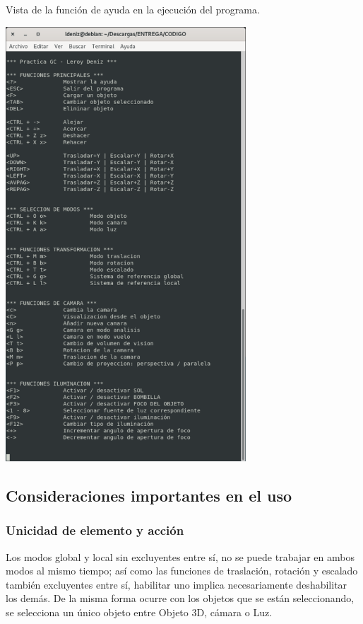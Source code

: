 \documentclass[12pt,a4paper]{article}
\begin{document}
\newpage
Vista de la función de ayuda en la ejecución del programa.

\begin{center}
\includegraphics[width=9cm]{images/ayuda}
\end{center}


\newpage
\subsection{Consideraciones importantes en el uso}

\subsubsection{Unicidad de elemento y acción}
Los modos global y local sin excluyentes entre sí,  no se puede trabajar en ambos modos al mismo tiempo; así como las funciones de traslación, rotación y escalado también excluyentes entre sí, habilitar uno implica necesariamente deshabilitar los demás. De la misma forma ocurre con los objetos que se están seleccionando, se selecciona un único objeto entre Objeto 3D, cámara o Luz.
\end{document}
